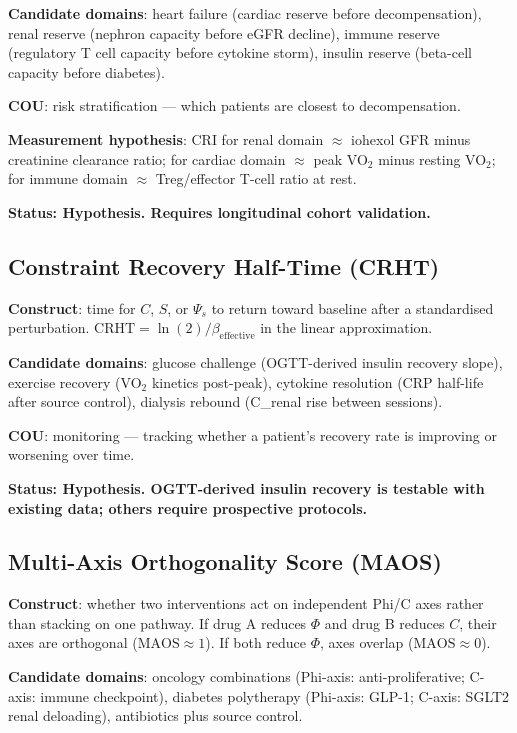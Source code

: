 \documentclass[12pt,a4paper]{article}
\begin{document}
\textbf{Candidate domains}: heart failure (cardiac reserve before decompensation), renal reserve (nephron capacity before eGFR decline), immune reserve (regulatory T cell capacity before cytokine storm), insulin reserve (beta-cell capacity before diabetes).

\textbf{COU}: risk stratification — which patients are closest to decompensation.

\textbf{Measurement hypothesis}: CRI for renal domain $\approx$ iohexol GFR minus creatinine clearance ratio; for cardiac domain $\approx$ peak VO$_2$ minus resting VO$_2$; for immune domain $\approx$ Treg/effector T-cell ratio at rest.

\textbf{Status: Hypothesis. Requires longitudinal cohort validation.}

\subsection{Constraint Recovery Half-Time (CRHT)}

\textbf{Construct}: time for $C$, $S$, or $\Psi_s$ to return toward baseline after a standardised perturbation. $\mathrm{CRHT} = \ln(2) / \beta_{\mathrm{effective}}$ in the linear approximation.

\textbf{Candidate domains}: glucose challenge (OGTT-derived insulin recovery slope), exercise recovery (VO$_2$ kinetics post-peak), cytokine resolution (CRP half-life after source control), dialysis rebound (C\_renal rise between sessions).

\textbf{COU}: monitoring — tracking whether a patient's recovery rate is improving or worsening over time.

\textbf{Status: Hypothesis. OGTT-derived insulin recovery is testable with existing data; others require prospective protocols.}

\subsection{Multi-Axis Orthogonality Score (MAOS)}

\textbf{Construct}: whether two interventions act on independent Phi/C axes rather than stacking on one pathway. If drug A reduces $\Phi$ and drug B reduces $C$, their axes are orthogonal ($\mathrm{MAOS} \approx 1$). If both reduce $\Phi$, axes overlap ($\mathrm{MAOS} \approx 0$).

\textbf{Candidate domains}: oncology combinations (Phi-axis: anti-proliferative; C-axis: immune checkpoint), diabetes polytherapy (Phi-axis: GLP-1; C-axis: SGLT2 renal deloading), antibiotics plus source control.
\end{document}
